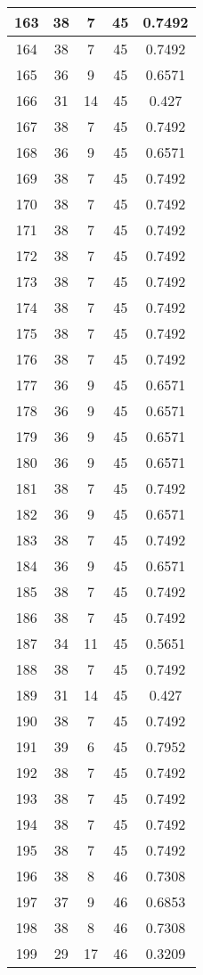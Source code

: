 \documentclass[letterpaper, 12pt]{article}
\begin{document}
\begin{longtable}{|c|c|c|c|c|}
\hline
163 & 38 & 7 & 45 & 0.7492 \\
\hline
164 & 38 & 7 & 45 & 0.7492 \\
\hline
165 & 36 & 9 & 45 & 0.6571 \\
\hline
166 & 31 & 14 & 45 & 0.427 \\
\hline
167 & 38 & 7 & 45 & 0.7492 \\
\hline
168 & 36 & 9 & 45 & 0.6571 \\
\hline
169 & 38 & 7 & 45 & 0.7492 \\
\hline
170 & 38 & 7 & 45 & 0.7492 \\
\hline
171 & 38 & 7 & 45 & 0.7492 \\
\hline
172 & 38 & 7 & 45 & 0.7492 \\
\hline
173 & 38 & 7 & 45 & 0.7492 \\
\hline
174 & 38 & 7 & 45 & 0.7492 \\
\hline
175 & 38 & 7 & 45 & 0.7492 \\
\hline
176 & 38 & 7 & 45 & 0.7492 \\
\hline
177 & 36 & 9 & 45 & 0.6571 \\
\hline
178 & 36 & 9 & 45 & 0.6571 \\
\hline
179 & 36 & 9 & 45 & 0.6571 \\
\hline
180 & 36 & 9 & 45 & 0.6571 \\
\hline
181 & 38 & 7 & 45 & 0.7492 \\
\hline
182 & 36 & 9 & 45 & 0.6571 \\
\hline
183 & 38 & 7 & 45 & 0.7492 \\
\hline
184 & 36 & 9 & 45 & 0.6571 \\
\hline
185 & 38 & 7 & 45 & 0.7492 \\
\hline
186 & 38 & 7 & 45 & 0.7492 \\
\hline
187 & 34 & 11 & 45 & 0.5651 \\
\hline
188 & 38 & 7 & 45 & 0.7492 \\
\hline
189 & 31 & 14 & 45 & 0.427 \\
\hline
190 & 38 & 7 & 45 & 0.7492 \\
\hline
191 & 39 & 6 & 45 & 0.7952 \\
\hline
192 & 38 & 7 & 45 & 0.7492 \\
\hline
193 & 38 & 7 & 45 & 0.7492 \\
\hline
194 & 38 & 7 & 45 & 0.7492 \\
\hline
195 & 38 & 7 & 45 & 0.7492 \\
\hline
196 & 38 & 8 & 46 & 0.7308 \\
\hline
197 & 37 & 9 & 46 & 0.6853 \\
\hline
198 & 38 & 8 & 46 & 0.7308 \\
\hline
199 & 29 & 17 & 46 & 0.3209 \\
\hline
\end{longtable}
\end{document}
